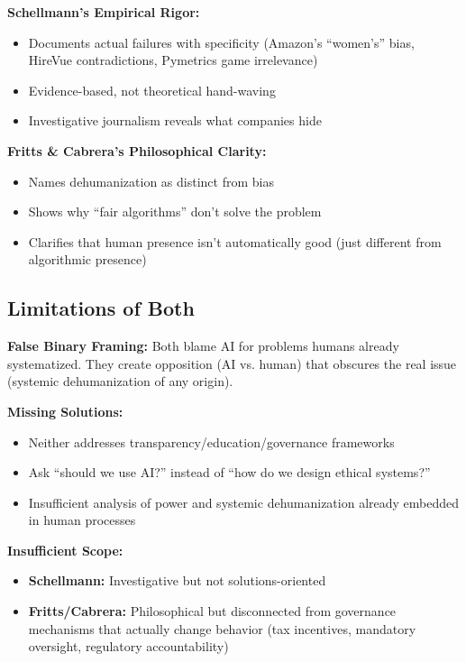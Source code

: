 \documentclass[12pt,letterpaper]{article}
\begin{document}
\begin{keyfindings}
\textbf{Schellmann's Empirical Rigor:}
\begin{itemize}[leftmargin=*,noitemsep]
    \item Documents actual failures with specificity (Amazon's ``women's'' bias, HireVue contradictions, Pymetrics game irrelevance)
    \item Evidence-based, not theoretical hand-waving
    \item Investigative journalism reveals what companies hide
\end{itemize}
\end{keyfindings}

\begin{keyfindings}
\textbf{Fritts \& Cabrera's Philosophical Clarity:}
\begin{itemize}[leftmargin=*,noitemsep]
    \item Names dehumanization as distinct from bias
    \item Shows why ``fair algorithms'' don't solve the problem
    \item Clarifies that human presence isn't automatically good (just different from algorithmic presence)
\end{itemize}
\end{keyfindings}

\subsection*{Limitations of Both}

\begin{criticalinsight}
\textbf{False Binary Framing:} Both blame AI for problems humans already systematized. They create opposition (AI vs. human) that obscures the real issue (systemic dehumanization of any origin).
\end{criticalinsight}

\textbf{Missing Solutions:}
\begin{itemize}[leftmargin=*,noitemsep]
    \item Neither addresses transparency/education/governance frameworks
    \item Ask ``should we use AI?'' instead of ``how do we design ethical systems?''
    \item Insufficient analysis of power and systemic dehumanization already embedded in human processes
\end{itemize}

\textbf{Insufficient Scope:}
\begin{itemize}[leftmargin=*,noitemsep]
    \item \textbf{Schellmann:} Investigative but not solutions-oriented
    \item \textbf{Fritts/Cabrera:} Philosophical but disconnected from governance mechanisms that actually change behavior (tax incentives, mandatory oversight, regulatory accountability)
\end{itemize}
\end{document}

